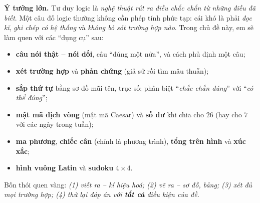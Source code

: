 \begin{knowbox}
\textbf{Ý tưởng lớn.} Tư duy logic là \emph{nghệ thuật rút ra điều chắc chắn từ những điều đã biết}. Một câu đố logic
thường không cần phép tính phức tạp: cái khó là phải \emph{đọc kĩ}, \emph{ghi chép có hệ thống} và \emph{không bỏ sót trường hợp nào}.
Trong chủ đề này, em sẽ làm quen với các ``dụng cụ'' sau:
\begin{itemize}[leftmargin=1.4em,itemsep=1pt,topsep=2pt]
  \item \textbf{câu nói thật -- nói dối}, câu ``đúng một nửa'', và cách phủ định một câu;
  \item \textbf{xét trường hợp} và \textbf{phản chứng} (giả sử rồi tìm mâu thuẫn);
  \item \textbf{sắp thứ tự} bằng sơ đồ mũi tên, trục số; phân biệt ``\emph{chắc chắn đúng}'' với ``\emph{có thể đúng}'';
  \item \textbf{mật mã dịch vòng} (mật mã Caesar) và \textbf{số dư} khi chia cho $26$ (hay cho $7$ với các ngày trong tuần);
  \item \textbf{ma phương}, \textbf{chiếc cân} (chính là phương trình), \textbf{tổng trên hình} và \textbf{xúc xắc};
  \item \textbf{hình vuông Latin} và \textbf{sudoku} $4\times 4$.
\end{itemize}
Bốn thói quen vàng: \emph{(1) viết ra -- kí hiệu hoá; (2) vẽ ra -- sơ đồ, bảng; (3) xét đủ mọi trường hợp; (4) thử lại
đáp án với \textbf{tất cả} điều kiện của đề.}
\end{knowbox}
\vspace{0.3cm}

